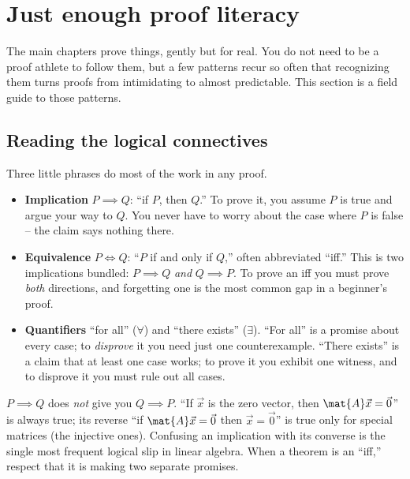 \section{Just enough proof literacy}

The main chapters prove things, gently but for real. You do not need to be a proof athlete
to follow them, but a few patterns recur so often that recognizing them turns proofs from
intimidating to almost predictable. This section is a field guide to those patterns.

\subsection{Reading the logical connectives}

Three little phrases do most of the work in any proof.

\begin{itemize}
  \item \textbf{Implication} $P \implies Q$: ``if $P$, then $Q$.'' To prove it, you assume
        $P$ is true and argue your way to $Q$. You never have to worry about the case
        where $P$ is false -- the claim says nothing there.
  \item \textbf{Equivalence} $P \iff Q$: ``$P$ if and only if $Q$,'' often abbreviated
        ``iff.'' This is two implications bundled: $P \implies Q$ \emph{and} $Q \implies
        P$. To prove an iff you must prove \emph{both} directions, and forgetting one is
        the most common gap in a beginner's proof.
  \item \textbf{Quantifiers} ``for all'' ($\forall$) and ``there exists'' ($\exists$).
        ``For all'' is a promise about every case; to \emph{disprove} it you need just one
        counterexample. ``There exists'' is a claim that at least one case works; to prove
        it you exhibit one witness, and to disprove it you must rule out all cases.
\end{itemize}

\begin{trapbox}
$P \implies Q$ does \emph{not} give you $Q \implies P$. ``If $\vec{x}$ is the zero vector,
then $\mat{A}\vec{x} = \vec{0}$'' is always true; its reverse ``if $\mat{A}\vec{x} =
\vec{0}$ then $\vec{x} = \vec{0}$'' is true only for special matrices (the injective
ones). Confusing an implication with its converse is the single most frequent logical slip
in linear algebra. When a theorem is an ``iff,'' respect that it is making two separate
promises.
\end{trapbox}

